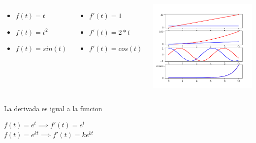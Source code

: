 \begin{frame}{2.7182818284590450907955982984276488423347473144}
   \begin{columns}[onlytextwidth]
      \begin{itemize}
         \item $f(t) =t$
         \item $f(t) =t^2$
         \item $f(t) =sin(t)$
      \end{itemize}
      \begin{itemize}
         \item $f'(t) = 1$
         \item $f'(t) = 2*t$
         \item $f'(t) = cos(t)$
      \end{itemize}
      \includegraphics[width=1.0\textwidth]{2_clase/derivadas}
   \end{columns}
   \begin{block}{La derivada es igual a la funcion}
      \begin{center}
         $f(t) =e^t    \implies f'(t) = e^t$\\
         $f(t) =e^{kt} \implies f'(t) =ke^{kt}$
      \end{center}
   \end{block}
   \vfill
\end{frame}
